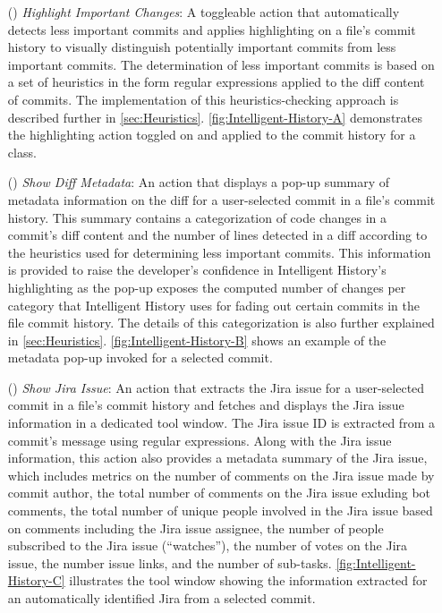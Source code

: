\begin{itemize}
    \item[(\feature{1})] \textit{Highlight Important Changes}: A toggleable action that automatically detects less important commits and applies highlighting on a file's commit history to visually distinguish potentially important commits from less important commits. 
        The determination of less important commits is based on a set of heuristics in the form regular expressions applied to the diff content of commits. 
        The implementation of this heuristics-checking approach is described further in \autoref{sec:Heuristics}. 
        \autoref{fig:Intelligent-History-A} demonstrates the highlighting action toggled on and applied to the commit history for a class.
    \item[(\feature{2})] \textit{Show Diff Metadata}: An action that displays a pop-up summary of metadata information on the diff for a user-selected commit in a file's commit history. 
        This summary contains a categorization of code changes in a commit's diff content and the number of lines detected in a diff according to the heuristics used for determining less important commits. 
        This information is provided to raise the developer's confidence in Intelligent History's highlighting as the pop-up exposes the computed number of changes per category that Intelligent History uses for fading out certain commits in the file commit history. 
        The details of this categorization is also further explained in \autoref{sec:Heuristics}. \autoref{fig:Intelligent-History-B} shows an example of the metadata pop-up invoked for a selected commit.
    \item[(\feature{3})] \textit{Show Jira Issue}: An action that extracts the Jira issue  for a user-selected commit in a file's commit history and fetches and displays the Jira issue information in a dedicated tool window. 
        The Jira issue ID is extracted from a commit's message using regular expressions. Along with the Jira issue information, 
        this action also provides a metadata summary of the Jira issue, which includes metrics on the number of comments on the Jira issue made by commit author, 
        the total number of comments on the Jira issue exluding bot comments, the total number of unique people involved in the Jira issue based on comments including the Jira issue assignee, 
        the number of people subscribed to the Jira issue (``watches''), the number of votes on the Jira issue, the number issue links, 
        and the number of sub-tasks. \autoref{fig:Intelligent-History-C} illustrates the tool window showing the information extracted for an automatically identified Jira  from a selected commit.
\end{itemize}

